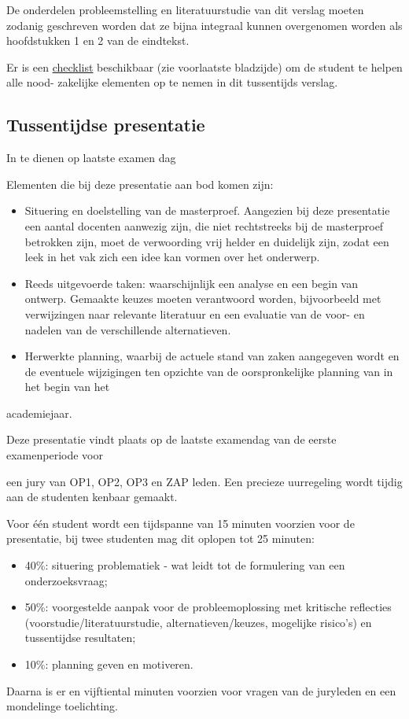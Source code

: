 \documentclass{scrartcl}
\begin{document}
De onderdelen probleemstelling en literatuurstudie van dit verslag moeten zodanig geschreven worden dat ze bijna integraal kunnen overgenomen worden als hoofdstukken 1 en 2 van de eindtekst.



Er is een \uline{checklist} beschikbaar (zie voorlaatste bladzijde) om de student te helpen alle nood- zakelijke elementen op te nemen in dit tussentijds verslag.



\subsection{Tussentijdse presentatie}

In te dienen op laatste examen dag



Elementen die bij deze presentatie aan bod komen zijn:

\begin{itemize}
\item Situering en doelstelling van de masterproef. Aangezien bij deze presentatie een aantal docenten aanwezig zijn, die niet rechtstreeks bij de masterproef betrokken zijn, moet de verwoording vrij helder en duidelijk zijn, zodat een leek in het vak zich een idee kan vormen over het onderwerp.
\item Reeds uitgevoerde taken: waarschijnlijk een analyse en een begin van ontwerp. Gemaakte keuzes moeten verantwoord worden, bijvoorbeeld met verwijzingen naar relevante literatuur en een evaluatie van de voor- en nadelen van de verschillende alternatieven.
\item Herwerkte planning, waarbij de actuele stand van zaken aangegeven wordt en de eventuele wijzigingen ten opzichte van de oorspronkelijke planning van in het begin van het
\end{itemize}
academiejaar.



Deze presentatie vindt plaats op de laatste examendag van de eerste examenperiode voor

een jury van OP1, OP2, OP3 en ZAP leden. Een precieze uurregeling wordt tijdig aan de studenten kenbaar gemaakt.

Voor één student wordt een tijdspanne van 15 minuten voorzien voor de presentatie, bij twee studenten mag dit oplopen tot 25 minuten:

\begin{itemize}
\item 40\%: situering problematiek - wat leidt tot de formulering van een onderzoeksvraag;
\item 50\%: voorgestelde aanpak voor de probleemoplossing met kritische reflecties (voorstudie/literatuurstudie, alternatieven/keuzes, mogelijke risico’s) en tussentijdse resultaten; 
\item 10\%: planning geven en motiveren.
\end{itemize}
Daarna is er en vijftiental minuten voorzien voor vragen van de juryleden en een mondelinge toelichting.
\end{document}
